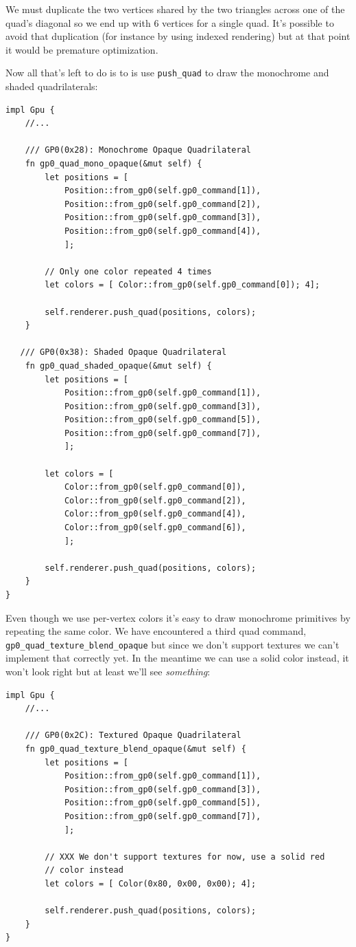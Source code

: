 \documentclass[a4paper]{article}
\newcommand{\code}[1] {\texttt{#1}}
\begin{document}
We must duplicate the two vertices shared by the two triangles across
one of the quad's diagonal so we end up with 6 vertices for a single
quad. It's possible to avoid that duplication (for instance by using
indexed rendering) but at that point it would be premature
optimization.

Now all that's left to do is to is use \code{push\_quad} to draw the
monochrome and shaded quadrilaterals:

\begin{lstlisting}
impl Gpu {
    //...

    /// GP0(0x28): Monochrome Opaque Quadrilateral
    fn gp0_quad_mono_opaque(&mut self) {
        let positions = [
            Position::from_gp0(self.gp0_command[1]),
            Position::from_gp0(self.gp0_command[2]),
            Position::from_gp0(self.gp0_command[3]),
            Position::from_gp0(self.gp0_command[4]),
            ];

        // Only one color repeated 4 times
        let colors = [ Color::from_gp0(self.gp0_command[0]); 4];

        self.renderer.push_quad(positions, colors);
    }

   /// GP0(0x38): Shaded Opaque Quadrilateral
    fn gp0_quad_shaded_opaque(&mut self) {
        let positions = [
            Position::from_gp0(self.gp0_command[1]),
            Position::from_gp0(self.gp0_command[3]),
            Position::from_gp0(self.gp0_command[5]),
            Position::from_gp0(self.gp0_command[7]),
            ];

        let colors = [
            Color::from_gp0(self.gp0_command[0]),
            Color::from_gp0(self.gp0_command[2]),
            Color::from_gp0(self.gp0_command[4]),
            Color::from_gp0(self.gp0_command[6]),
            ];

        self.renderer.push_quad(positions, colors);
    }
}
\end{lstlisting}

Even though we use per-vertex colors it's easy to draw monochrome
primitives by repeating the same color. We have encountered a third
quad command, \code{gp0\_quad\_texture\_blend\_opaque} but since we
don't support textures we can't implement that correctly yet. In the
meantime we can use a solid color instead, it won't look right but at
least we'll see \emph{something}:

\begin{lstlisting}
impl Gpu {
    //...

    /// GP0(0x2C): Textured Opaque Quadrilateral
    fn gp0_quad_texture_blend_opaque(&mut self) {
        let positions = [
            Position::from_gp0(self.gp0_command[1]),
            Position::from_gp0(self.gp0_command[3]),
            Position::from_gp0(self.gp0_command[5]),
            Position::from_gp0(self.gp0_command[7]),
            ];

        // XXX We don't support textures for now, use a solid red
        // color instead
        let colors = [ Color(0x80, 0x00, 0x00); 4];

        self.renderer.push_quad(positions, colors);
    }
}
\end{lstlisting}
\end{document}

